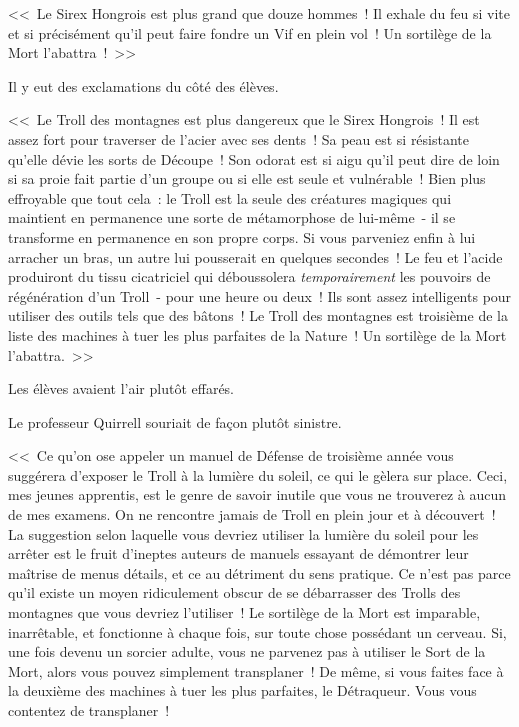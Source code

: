 <<~Le Sirex Hongrois est plus grand que douze hommes~! Il exhale du feu si vite et si précisément qu'il peut faire fondre un Vif en plein vol~! Un sortilège de la Mort l'abattra~!~>>

Il y eut des exclamations du côté des élèves.

<<~Le Troll des montagnes est plus dangereux que le Sirex Hongrois~! Il est assez fort pour traverser de l'acier avec ses dents~! Sa peau est si résistante qu'elle dévie les sorts de Découpe~! Son odorat est si aigu qu'il peut dire de loin si sa proie fait partie d'un groupe ou si elle est seule et vulnérable~! Bien plus effroyable que tout cela~: le Troll est la seule des créatures magiques qui maintient en permanence une sorte de métamorphose de lui-même~- il se transforme en permanence en son propre corps. Si vous parveniez enfin à lui arracher un bras, un autre lui pousserait en quelques secondes~! Le feu et l'acide produiront du tissu cicatriciel qui déboussolera \emph{temporairement} les pouvoirs de régénération d'un Troll~- pour une heure ou deux~! Ils sont assez intelligents pour utiliser des outils tels que des bâtons~! Le Troll des montagnes est troisième de la liste des machines à tuer les plus parfaites de la Nature~! Un sortilège de la Mort l'abattra.~>>

Les élèves avaient l'air plutôt effarés.

Le professeur Quirrell souriait de façon plutôt sinistre.

<<~Ce qu'on ose appeler un manuel de Défense de troisième année vous suggérera d'exposer le Troll à la lumière du soleil, ce qui le gèlera sur place. Ceci, mes jeunes apprentis, est le genre de savoir inutile que vous ne trouverez à aucun de mes examens. On ne rencontre jamais de Troll en plein jour et à découvert~! La suggestion selon laquelle vous devriez utiliser la lumière du soleil pour les arrêter est le fruit d'ineptes auteurs de manuels essayant de démontrer leur maîtrise de menus détails, et ce au détriment du sens pratique. Ce n'est pas parce qu'il existe un moyen ridiculement obscur de se débarrasser des Trolls des montagnes que vous devriez l'utiliser~! Le sortilège de la Mort est imparable, inarrêtable, et fonctionne à chaque fois, sur toute chose possédant un cerveau. Si, une fois devenu un sorcier adulte, vous ne parvenez pas à utiliser le Sort de la Mort, alors vous pouvez simplement transplaner~! De même, si vous faites face à la deuxième des machines à tuer les plus parfaites, le Détraqueur. Vous vous contentez de transplaner~!

